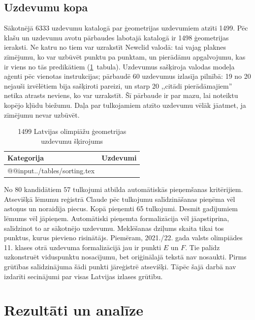 \documentclass[nolabels]{../template/zpd}
\begin{document}
\subsection{Uzdevumu kopa}
Sākotnējā 6333 uzdevumu katalogā par ģeometrijas uzdevumiem atzīti 1499. Pēc klašu un uzdevumu avotu pārbaudes labotajā katalogā ir 1498 ģeometrijas ieraksti. Ne katru no tiem var uzrakstīt Newclid valodā: tai vajag plaknes zīmējumu, ko var
uzbūvēt punktu pa punktam, un pierādāmu apgalvojumu, kas ir viens no tās predikātiem (\ref{tab:sorting}~tabula).
Uzdevumus sašķiroja valodas modeļa aģenti pēc vienotas instrukcijas; pārbaudē 60 uzdevumus izlasīja
pilnībā: 19 no 20 nejauši izvēlētiem bija sašķiroti pareizi, un starp 20 ,,citādi pierādāmajiem''
netika atrasts neviens, ko var uzrakstīt. Šī pārbaude ir par mazu, lai noteiktu kopējo kļūdu biežumu. Daļa par tulkojamiem atzīto uzdevumu vēlāk jāatmet, ja zīmējumu nevar uzbūvēt.

\begin{table}[H]
  \caption{1499 Latvijas olimpiāžu ģeometrijas uzdevumu šķirojums}\label{tab:sorting}
  \centering\small
  \begin{tabular}{@{}lr@{}}
    \toprule
    Kategorija & Uzdevumi \\
    \midrule
    \csname @@input\endcsname ../tables/sorting.tex 
    \bottomrule
  \end{tabular}
\end{table}

No 80 kandidātiem 57 tulkojumi atbilda automātiskās pieņemšanas kritērijiem. Atsevišķā lēmumu reģistrā Claude pēc tulkojumu salīdzināšanas pieņēma vēl astoņus un noraidīja piecus. Kopā pieņemti 65 tulkojumi. Desmit gadījumiem lēmums vēl jāpieņem. Automātiski pieņemta formalizācija vēl jāapstiprina, salīdzinot to ar sākotnējo uzdevumu. Meklēšanas dziļums skaita tikai tos punktus, kurus pievieno risinātājs. Piemēram, 2021./22. gada valsts olimpiādes 11. klases otrā uzdevuma formalizācijā jau ir punkti $E$ un $F$. Tie palīdz uzkonstruēt viduspunktu nosacījumu, bet oriģinālajā tekstā nav nosaukti. Pirms grūtības salīdzinājuma šādi punkti jāreģistrē atsevišķi. Tāpēc šajā darbā nav izdarīti secinājumi par visas Latvijas izlases grūtību.

\section{Rezultāti un analīze}
\end{document}
